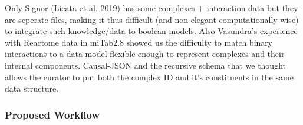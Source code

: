\documentclass[
  12pt,
]{book}
\begin{document}
Only Signor (Licata et al. \protect\hyperlink{ref-Licata2019}{2019}) has some complexes + interaction data but they are seperate files, making it thus difficult (and non-elegant computationally-wise) to integrate such knowledge/data to boolean models.
Also Vasundra's experience with Reactome data in miTab2.8 showed us the difficulty to match binary interactions to a data model flexible enough to represent complexes and their internal components. Causal-JSON and the recursive schema that we thought allows the curator to put both the complex ID and it's constituents in the same data structure.

\hypertarget{proposed-workflow}{%
\subsubsection*{Proposed Workflow}\label{proposed-workflow}}
\end{document}
